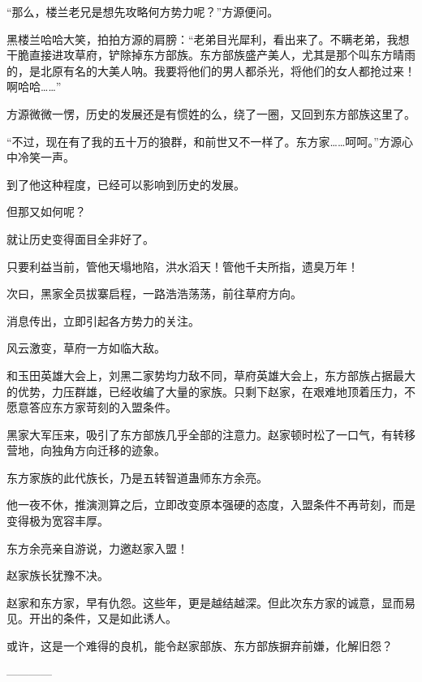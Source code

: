 \begin{this_body}
“那么，楼兰老兄是想先攻略何方势力呢？”方源便问。

黑楼兰哈哈大笑，拍拍方源的肩膀：“老弟目光犀利，看出来了。不瞒老弟，我想干脆直接进攻草府，铲除掉东方部族。东方部族盛产美人，尤其是那个叫东方晴雨的，是北原有名的大美人呐。我要将他们的男人都杀光，将他们的女人都抢过来！啊哈哈……”

方源微微一愣，历史的发展还是有惯姓的么，绕了一圈，又回到东方部族这里了。

“不过，现在有了我的五十万的狼群，和前世又不一样了。东方家……呵呵。”方源心中冷笑一声。

到了他这种程度，已经可以影响到历史的发展。

但那又如何呢？

就让历史变得面目全非好了。

只要利益当前，管他天塌地陷，洪水滔天！管他千夫所指，遗臭万年！

次曰，黑家全员拔寨启程，一路浩浩荡荡，前往草府方向。

消息传出，立即引起各方势力的关注。

风云激变，草府一方如临大敌。

和玉田英雄大会上，刘黑二家势均力敌不同，草府英雄大会上，东方部族占据最大的优势，力压群雄，已经收编了大量的家族。只剩下赵家，在艰难地顶着压力，不愿意答应东方家苛刻的入盟条件。

黑家大军压来，吸引了东方部族几乎全部的注意力。赵家顿时松了一口气，有转移营地，向独角方向迁移的迹象。

东方家族的此代族长，乃是五转智道蛊师东方余亮。

他一夜不休，推演测算之后，立即改变原本强硬的态度，入盟条件不再苛刻，而是变得极为宽容丰厚。

东方余亮亲自游说，力邀赵家入盟！

赵家族长犹豫不决。

赵家和东方家，早有仇怨。这些年，更是越结越深。但此次东方家的诚意，显而易见。开出的条件，又是如此诱人。

或许，这是一个难得的良机，能令赵家部族、东方部族摒弃前嫌，化解旧怨？

------------

\end{this_body}

